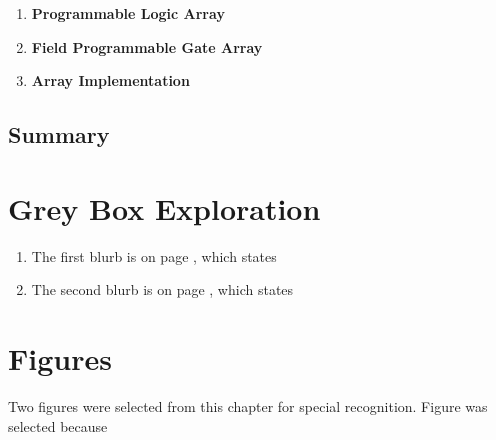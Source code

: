 \documentclass[12pt]{article}
\begin{document}
\begin{enumerate}
  \item \textbf{Programmable Logic Array}

  \item \textbf{Field Programmable Gate Array}

  \item \textbf{Array Implementation}
\end{enumerate}

\subsection{Summary}

\section{Grey Box Exploration}

\begin{enumerate}
  \item The first blurb is on page , which states \textit{}

  \item The second blurb is on page , which states \textit{}
\end{enumerate}

\section{Figures}

Two figures were selected from this chapter for special recognition. Figure was selected because

\end{document}
